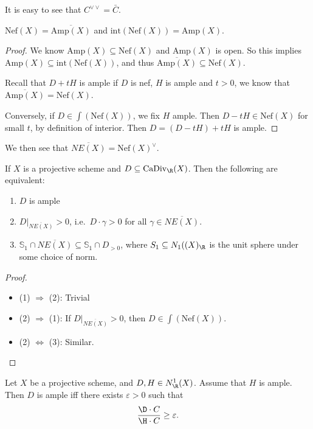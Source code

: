\documentclass[a4paper]{article}
\newcommand\CaDiv{\mathrm{CaDiv}}
\newcommand\Amp{\mathrm{Amp}}
\newcommand\Nef{\mathrm{Nef}}
\begin{document}
It is easy to see that $C^{\vee \vee} = \bar{C}$.

\begin{prop}
  $\Nef(X) = \overline{\Amp(X)}$ and $\mathrm{int}(\Nef(X)) = \Amp(X)$.
\end{prop}

\begin{proof}
  We know $\Amp(X) \subseteq \Nef(X)$ and $\Amp(X)$ is open. So this implies $\Amp(X) \subseteq \mathrm{int}(\Nef(X))$, and thus $\overline{\Amp(X)} \subseteq \Nef(X)$.

  Recall that $D + tH$ is ample if $D$ is nef, $H$ is ample and $t > 0$, we know that $\overline{\Amp(X)} = \Nef(X)$.

  Conversely, if $D \in \int(\Nef(X))$, we fix $H$ ample. Then $D - tH \in \Nef(X)$ for small $t$, by definition of interior. Then $D = (D - tH) + tH$ is ample.
\end{proof}
We then see that $\overline{NE(X)} = \Nef(X)^\vee$.
\begin{thm}
  If $X$ is a projective scheme and $D \subseteq \CaDiv_\R(X)$. Then the following are equivalent:
  \begin{enumerate}
    \item $D$ is ample
    \item $D|_{\overline{NE(X)}} > 0$, i.e.\ $D \cdot \gamma > 0$ for all $\gamma \in \overline{NE(X)}$.
    \item $\mathbb{S}_1 \cap \overline{NE(X)} \subseteq \mathbb{S}_1 \cap D_{>0}$, where $S_1 \subseteq N_1((X)_\R$ is the unit sphere under some choice of norm.
  \end{enumerate}
\end{thm}

\begin{proof}\leavevmode
  \begin{itemize}
    \item (1) $\Rightarrow$ (2): Trivial
    \item (2) $\Rightarrow$ (1): If $D|_{\overline{NE(X)}} > 0$, then $D \in \int (\Nef(X))$.
    \item (2) $\Leftrightarrow$ (3): Similar.\qedhere
  \end{itemize}
\end{proof}

\begin{thm}
  Let $X$ be a projective scheme, and $D, H \in N^1_\R(X)$. Assume that $H$ is ample. Then $D$ is ample iff there exists $\varepsilon > 0$ such that
  \[
    \frac{\D \cdot C}{\H \cdot C} \geq \varepsilon.
  \]
\end{thm}
\end{document}
